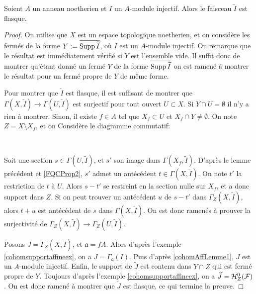 \begin{prop}\label{cohomAffProp1}
Soient $A$ un anneau noetherien et $I$ un $A$-module injectif. Alors le faisceau $\widetilde{I}$ est flasque.
\end{prop}
\begin{proof}
On utilise que $X$ est un espace topologique noetherien, et on considère les fermés de la forme $Y:=\overline{\operatorname{Supp} \widetilde{I}}$, où $I$ est un $A$-module injectif. On remarque que le résultat est immédiatement vérifié si $Y$ est l'ensemble vide. Il suffit donc de montrer qu'étant donné un fermé $Y$ de la forme $\overline{\operatorname{Supp} \widetilde{I}}$ on est ramené à montrer le résultat pour un fermé propre de $Y$ de même forme.

Pour montrer que $\widetilde{I}$ est flasque, il est suffisant de montrer que $\Gamma(X,\widetilde{I})\rightarrow\Gamma(U,\widetilde{I})$ est surjectif pour tout ouvert $U\subset X$. Si $Y\cap U=\emptyset$ il n'y a rien à montrer. Sinon, il existe $f\in A$ tel que $X_f\subset U$ et $X_f\cap Y\neq \emptyset$. On note $Z= X\setminus X_f$, et on Considère le diagramme commutatif:

	\begin{center}
	\\
	\end{center}
Soit une section $s\in\Gamma(U,\widetilde{I})$, et $s'$ son image dans $\Gamma(X_f,\widetilde{I})$. D'après le lemme précédent et \ref{FQCProp2}, $s'$ admet un antécédent $t\in \Gamma(X,\widetilde{I})$. On note $t'$ la restriction de $t$ à $U$. Alors $s-t'$ se restreint en la section nulle sur $X_f$, et a donc support dans $Z$. Si on peut trouver un antécédent $u$ de $s-t'$ dans $\Gamma_Z(X,\widetilde{I})$, alors $t+u$ est antécédent de $s$ dans $\Gamma(X,\widetilde{I})$. On est donc ramenés à prouver la surjectivité de $\Gamma_Z(X,\widetilde{I})\rightarrow\Gamma_Z(U,\widetilde{I})$.

Posons $J=\Gamma_Z(X,\widetilde{I})$, et $\mathfrak{a}=fA$. Alors d'après l'exemple \ref{cohomsupportaffineex}, on a $J=\Gamma_\mathfrak{a}(I)$. Puis d'après \ref{cohomAffLemme1}, $J$ est un $A$-module injectif. Enfin, le support de $\widetilde{J}$ est contenu dans $Y\cap Z$ qui est fermé propre de $Y$.  Toujours d'après l'exemple \ref{cohomsupportaffineex}, on a $\widetilde{J} = \mathcal{H} ^0 _Z(\mathcal{F})$. On est donc ramené à montrer que $\widetilde{J}$ est flasque, ce qui termine la preuve.
\end{proof}


